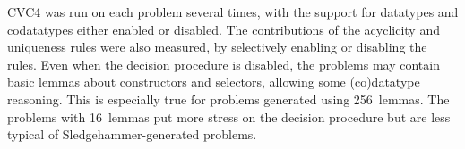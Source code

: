 \documentclass[smallcondensed,draft]{svjour3}
\begin{document}
CVC4 was run on each problem several times, with the
support for datatypes and codatatypes either enabled or disabled. The
contributions of the acyclicity and uniqueness rules were also measured,
by selectively enabling or disabling the rules.
Even when the
decision procedure is disabled, the problems may contain
basic lemmas about constructors and selectors, allowing some (co)datatype
reasoning. This is especially true for problems generated using 256~lemmas.
The problems with 16~lemmas put more stress on the decision procedure but are
less typical of Sledgehammer-generated problems.




\newcommand\nummodden{num\hbox{\rm\_}mod\hbox{\rm\_}den}

\newcommand\captioni{\,Number of solved goals with 16~lemmas per goal}
\newcommand\captionii{\,Number of solved goals with 256~lemmas per goal}
\end{document}
